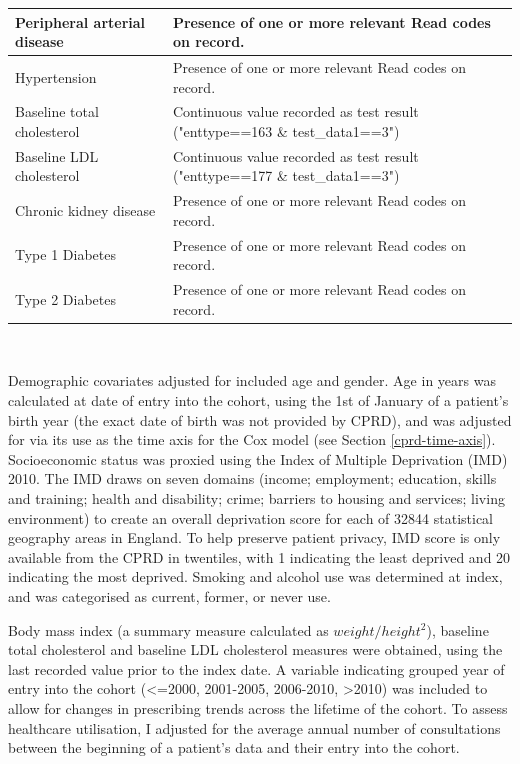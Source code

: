 \documentclass[a4paper, twoside]{templates/ociamthesis}
\begin{document}
\begin{table}[H]
\begin{tabular}[t]{>{\raggedright\arraybackslash}p{15em}>{\centering\arraybackslash}p{25em}}
\midrule
Peripheral arterial disease & Presence of one or more relevant Read codes on record.\\
\midrule
\addlinespace
Hypertension & Presence of one or more relevant Read codes on record.\\
\midrule
Baseline total cholesterol & Continuous value recorded as test result ("enttype==163 \& test\_data1==3")\\
\midrule
Baseline LDL cholesterol & Continuous value recorded as test result ("enttype==177 \& test\_data1==3")\\
\midrule
Chronic kidney disease & Presence of one or more relevant Read codes on record.\\
\midrule
Type 1 Diabetes & Presence of one or more relevant Read codes on record.\\
\midrule
\addlinespace
Type 2 Diabetes & Presence of one or more relevant Read codes on record.\\
\bottomrule
\end{tabular}
\end{table}

~

Demographic covariates adjusted for included age and gender. Age in years was calculated at date of entry into the cohort, using the 1st of January of a patient's birth year (the exact date of birth was not provided by CPRD), and was adjusted for via its use as the time axis for the Cox model (see Section \ref{cprd-time-axis}). Socioeconomic status was proxied using the Index of Multiple Deprivation (IMD) 2010. The IMD draws on seven domains (income; employment; education, skills and training; health and disability; crime; barriers to housing and services; living environment) to create an overall deprivation score for each of 32844 statistical geography areas in England. To help preserve patient privacy, IMD score is only available from the CPRD in twentiles, with 1 indicating the least deprived and 20 indicating the most deprived. Smoking and alcohol use was determined at index, and was categorised as current, former, or never use.

Body mass index (a summary measure calculated as \(weight/height^2\)), baseline total cholesterol and baseline LDL cholesterol measures were obtained, using the last recorded value prior to the index date. A variable indicating grouped year of entry into the cohort (\textless=2000, 2001-2005, 2006-2010, \textgreater2010) was included to allow for changes in prescribing trends across the lifetime of the cohort. To assess healthcare utilisation, I adjusted for the average annual number of consultations between the beginning of a patient's data and their entry into the cohort.
\end{document}
